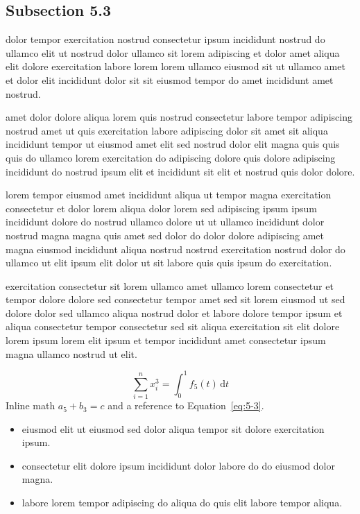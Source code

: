 \documentclass{article}
\begin{document}
\subsection{Subsection 5.3}\label{sec:5-3}
dolor tempor exercitation nostrud consectetur ipsum incididunt nostrud do ullamco elit ut nostrud dolor ullamco sit lorem adipiscing et dolor amet aliqua elit dolore exercitation labore lorem lorem ullamco eiusmod sit ut ullamco amet et dolor elit incididunt dolor sit sit eiusmod tempor do amet incididunt amet nostrud.

amet dolor dolore aliqua lorem quis nostrud consectetur labore tempor adipiscing nostrud amet ut quis exercitation labore adipiscing dolor sit amet sit aliqua incididunt tempor ut eiusmod amet elit sed nostrud dolor elit magna quis quis quis do ullamco lorem exercitation do adipiscing dolore quis dolore adipiscing incididunt do nostrud ipsum elit et incididunt sit elit et nostrud quis dolor dolore.

lorem tempor eiusmod amet incididunt aliqua ut tempor magna exercitation consectetur et dolor lorem aliqua dolor lorem sed adipiscing ipsum ipsum incididunt dolore do nostrud ullamco dolore ut ut ullamco incididunt dolor nostrud magna magna quis amet sed dolor do dolor dolore adipiscing amet magna eiusmod incididunt aliqua nostrud nostrud exercitation nostrud dolor do ullamco ut elit ipsum elit dolor ut sit labore quis quis ipsum do exercitation.

exercitation consectetur sit lorem ullamco amet ullamco lorem consectetur et tempor dolore dolore sed consectetur tempor amet sed sit lorem eiusmod ut sed dolore dolor sed ullamco aliqua nostrud dolor et labore dolore tempor ipsum et aliqua consectetur tempor consectetur sed sit aliqua exercitation sit elit dolore lorem ipsum lorem elit ipsum et tempor incididunt amet consectetur ipsum magna ullamco nostrud ut elit.

\begin{equation}\label{eq:5-3}
  \sum_{i=1}^{n} x_i^{3} = \int_0^1 f_{5}(t)\,\mathrm{d}t
\end{equation}
Inline math $a_{5} + b_{3} = c$ and a reference to Equation~\eqref{eq:5-3}.

\begin{itemize}
  \item eiusmod elit ut eiusmod sed dolor aliqua tempor sit dolore exercitation ipsum.
  \item consectetur elit dolore ipsum incididunt dolor labore do do eiusmod dolor magna.
  \item labore lorem tempor adipiscing do aliqua do quis elit labore tempor aliqua.
\end{itemize}
\end{document}
